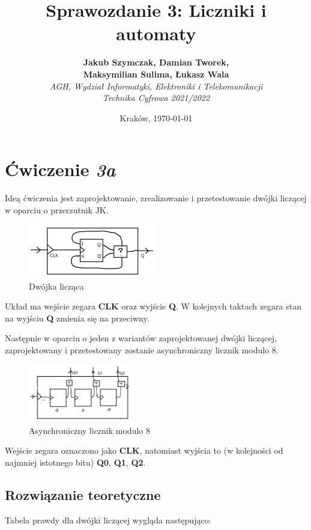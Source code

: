 \documentclass{article}
\title{Sprawozdanie 3: Liczniki i automaty}
\author{\textbf{Jakub Szymczak, Damian Tworek,}\\ \textbf{Maksymilian Sulima, Łukasz Wala} \\
    \textit{AGH, Wydział Informatyki, Elektroniki i Telekomunikacji} \\
    \textit{Technika Cyfrowa 2021/2022}}
\date{Kraków, \today}
\begin{document}
\maketitle

\section{Ćwiczenie \textit{3a}}
Ideą ćwiczenia jest zaprojektowanie, zrealizowanie i przetestowanie dwójki liczącej w oparciu o przerzutnik JK. 

\begin{figure}[H]
    \centering
    \includegraphics[width=0.5\textwidth]{3a_idea_1.jpg}
    \caption{Dwójka licząca}
\end{figure}

Układ ma wejście zegara \textbf{CLK} oraz wyjście \textbf{Q}. W kolejnych taktach zegara stan na wyjściu \textbf{Q} zmienia się na przeciwny.

Następnie w oparciu o jeden z wariantów zaprojektowanej dwójki liczącej, zaprojektowany i przetestowany zostanie asynchroniczny licznik
modulo 8.

\begin{figure}[H]
    \centering
    \includegraphics[width=0.4\textwidth]{3a_idea_2.jpg}
    \caption{Asynchroniczny licznik modulo 8}
\end{figure}

Wejście zegara oznaczono jako \textbf{CLK}, natomiast wyjścia to (w kolejności od najmniej istotnego bitu) 
\textbf{Q0}, \textbf{Q1}, \textbf{Q2}.

\subsection{Rozwiązanie teoretyczne}

Tabela prawdy dla dwójki liczącej wygląda następująco:
\end{document}

